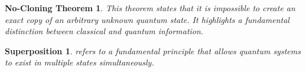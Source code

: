 \documentclass{article}
\begin{document}
\color{blue}
\newtheorem{thmv}{No-Cloning Theorem}
\newtheorem{dfnb}{Superposition}

\begin{thmv}
\color{black}
This theorem states that it is impossible to create an exact copy of an arbitrary unknown quantum state. It highlights a fundamental distinction between classical and quantum information.
\end{thmv}

\begin{dfnb}
\color{black}
refers to a fundamental principle that allows quantum systems to exist in multiple states simultaneously.
\end{dfnb}
\end{document}

